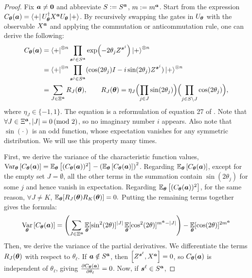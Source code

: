 \documentclass{article}
\theoremstyle{plain}
\theoremstyle{definition}
\theoremstyle{remark}
\begin{document}
\begin{proof}
Fix ${\bm{a}}\neq \mathbf 0$ and abbreviate $S:=S^{\bm{a}}$, $m:=m^{\bm{a}}$. Start from the expression $C_{\bm{\theta}}({\bm{a}})=\bra{+} U_{\bm{\theta}}^\dagger X^{{\bm{a}}}U_{\bm{\theta}}\ket{+}
$. By recursively swapping the gates in $U_{\bm{\theta}}$ with the observable $X^{{\bm{a}}}$ and applying the commutation or anticommutation rule, one can derive the following:
\begin{align*}
C_{\bm{\theta}}({\bm{a}})
&= \bra{+}^{\otimes n} \prod_{{\bm{s}^j}\in S^{\bm{a}}} \exp(-2\theta_jZ^{\bm{s}^j}) \ket{+}^{\otimes n} \\
&= \bra{+}^{\otimes n} \prod_{{\bm{s}^j}\in S^{\bm{a}}} (\cos(2\theta_j)I - i \sin(2\theta_j)Z^{\bm{s}^j}) \ket{+}^{\otimes n}  \\
&= \sum_{J\in\Xi^{\bm{a}}} R_J({\bm{\theta}}), \qquad R_J({\bm{\theta}})=\eta_J 
\Bigl(\prod_{j\in J} \sin(2\theta_j)\Bigr)\Bigl(\prod_{j\in S\setminus J}\cos(2\theta_j)\Bigr),
\end{align*}
where $\eta_J \in \{-1,1\}$. The equation is a reformulation of equation 27 of \cite{recioarmengol25}. Note that $\forall J \in \Xi^{\bm{a}}, \abs{J} = 0 \, (\text{mod 2})$, so no imaginary number $i$ appears. Also note that $\sin(\cdot)$ is an odd function, whose expectation vanishes for any symmetric distribution. We will use this property many times.

First, we derive the variance of the characteristic function values, $\operatorname*{Var}_{\bm{\theta}} \left[ C_{\bm{\theta}}({\bm{a}}) \right] = \operatorname*{\mathbb{E}}_{\bm{\theta}} \left[ (C_{\bm{\theta}}({\bm{a}}))^2\right] - \left(\operatorname*{\mathbb{E}}_{\bm{\theta}} \left[ C_{\bm{\theta}}({\bm{a}}) \right]\right)^2$. Regarding $\operatorname*{\mathbb{E}}_{\bm{\theta}} \left[ C_{\bm{\theta}}({\bm{a}}) \right]$, except for the empty set $J = \emptyset$, all the other terms in the summation contain $\sin(2\theta_j)$ for some $j$ and hence vanish in expectation. Regarding $\operatorname*{\mathbb{E}}_{\bm{\theta}} \left[ (C_{\bm{\theta}}({\bm{a}}))^2\right]$, for the same reason, $\forall J \neq K$,  $\operatorname*{\mathbb{E}}_{{\bm{\theta}}}[R_J({\bm{\theta}})R_K({\bm{\theta}})] = 0.$ Putting the remaining terms together gives the formula:
\begin{equation*}
\label{eq: symmetric cost variance}
     \operatorname*{Var}_{\bm{\theta}} \left[ C_{\bm{\theta}}({\bm{a}}) \right] = \left(\sum_{J \in \Xi^{\bm{a}}} \operatorname*{\mathbb{E}}_{{\bm{\theta}}}[\sin^2(2\theta)]^\abs{J} \operatorname*{\mathbb{E}}_{{\bm{\theta}}}[\cos^2(2\theta)]^{m^{\bm{a}}-\abs{J}}\right) - \operatorname*{\mathbb{E}}_{{\bm{\theta}}}[\cos(2\theta)]^{2m^{\bm{a}}}
\end{equation*}
Then, we derive the variance of the partial derivatives. We differentiate the terms $R_J({\bm{\theta}})$ with respect to $\theta_\ell$. If ${\bm{a}} \notin S^{\bm{a}}$, then $\comm{Z^{\vts^\ell}}{X^\vta}=0$, so $C_{\bm{\theta}}({\bm{a}})$ is independent of $\theta_\ell$, giving $\frac{\partial C_{\bm{\theta}}({\bm{a}})}{\partial \theta_\ell}=0$. Now, if ${\bm{s}^\ell} \in S^{\bm{a}}$,


\end{proof}
\end{document}
